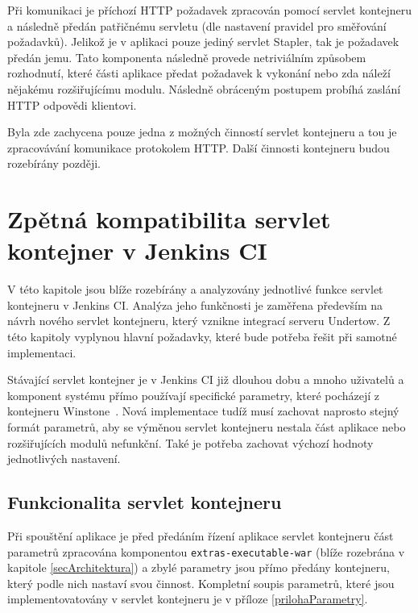             Při komunikaci je příchozí HTTP požadavek zpracován pomocí servlet kontejneru 
            a následně předán patřičnému servletu (dle nastavení pravidel pro směřování požadavků).
            Jelikož je v aplikaci pouze jediný servlet Stapler, tak je požadavek předán jemu.
            Tato komponenta následně provede netriviálním způsobem rozhodnutí, které
            části aplikace předat požadavek k vykonání  nebo zda náleží nějakému rozšiřujícímu modulu.
            Následně obráceným postupem probíhá zaslání HTTP odpovědi klientovi.

            Byla zde zachycena pouze jedna z možných činností
            servlet kontejneru a tou je zpracovávání komunikace protokolem HTTP. 
            Další činnosti kontejneru budou rozebírány později.

 


    \section{Zpětná kompatibilita servlet kontejner v Jenkins CI}
        V této kapitole jsou blíže rozebírány a analyzovány jednotlivé funkce servlet
        kontejneru v Jenkins CI. Analýza jeho funkčnosti je zaměřena především na 
        návrh nového servlet kontejneru, který vznikne integrací serveru Undertow.
        Z této kapitoly vyplynou hlavní požadavky, které bude potřeba řešit 
        při samotné implementaci.

        Stávající servlet kontejner je v Jenkins CI již dlouhou dobu a 
        mnoho uživatelů a komponent systému přímo používají specifické
        parametry, které pocházejí z kontejneru Winstone~\cite{kohsukeTopic}. Nová implementace
        tudíž musí zachovat naprosto stejný formát parametrů, aby 
        se výměnou servlet kontejneru nestala část aplikace nebo rozšiřujících modulů nefunkční.
        Také je potřeba zachovat výchozí hodnoty jednotlivých nastavení.

        \subsection{Funkcionalita servlet kontejneru}
            Při spouštění aplikace je před předáním řízení aplikace servlet kontejneru
            část parametrů zpracována komponentou \texttt{extras-executable-war} (blíže 
            rozebrána v kapitole \ref{secArchitektura}) a zbylé parametry jsou přímo
            předány kontejneru, který podle nich nastaví svou činnost. Kompletní
            soupis parametrů, které jsou implementovatovány v servlet kontejneru
            je v příloze \ref{prilohaParametry}.

